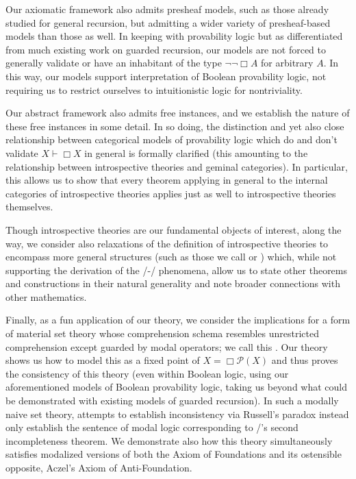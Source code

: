 Our axiomatic framework also admits presheaf models, such as those already studied for general recursion, but admitting a wider variety of presheaf-based models than those as well. In keeping with provability logic but as differentiated from much existing work on guarded recursion, our models are not forced to generally validate or have an inhabitant of the type $\neg \neg \Box A$ for arbitrary $A$. In this way, our models support interpretation of Boolean provability logic, not requiring us to restrict ourselves to intuitionistic logic for nontriviality.

Our abstract framework also admits free instances, and we establish the nature of these free instances in some detail. In so doing, the distinction and yet also close relationship between categorical models of provability logic which do and don't validate $X \vdash \Box X$ in general is formally clarified (this amounting to the relationship between introspective theories and geminal categories). In particular, this allows us to show that every theorem applying in general to the internal categories of introspective theories applies just as well to introspective theories themselves.

Though introspective theories are our fundamental objects of interest, along the way, we consider also relaxations of the definition of introspective theories to encompass more general structures (such as those we call  or ) which, while not supporting the derivation of the \Godel/-\Lob/ phenomena, allow us to state other theorems and constructions in their natural generality and note broader connections with other mathematics.

Finally, as a fun application of our theory, we consider the implications for a form of material set theory whose comprehension schema resembles unrestricted comprehension except guarded by modal operators; we call this . Our theory shows us how to model this as a fixed point of $X = \Box \mathcal{P}(X)$ and thus proves the consistency of this theory (even within Boolean logic, using our aforementioned models of Boolean provability logic, taking us beyond what could be demonstrated with existing models of guarded recursion). In such a modally naive set theory, attempts to establish inconsistency via Russell's paradox instead only establish the sentence of modal logic corresponding to \Godel/'s second incompleteness theorem. We demonstrate also how this theory simultaneously satisfies modalized versions of both the Axiom of Foundations and its ostensible opposite, Aczel's Axiom of Anti-Foundation.


